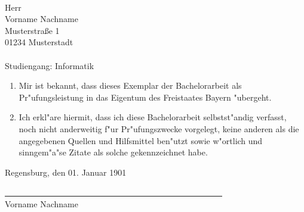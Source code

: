 %
%
\text{ }
\vspace{7cm}
\\
Herr\\
Vorname Nachname\\
Musterstraße 1\\
01234 Musterstadt\\\\
Studiengang: Informatik\\

\begin{enumerate}
\item Mir ist bekannt, dass dieses Exemplar der Bachelorarbeit als Pr"ufungsleistung in das Eigentum des Freistaates Bayern "ubergeht.
\item Ich erkl"are hiermit, dass ich diese Bachelorarbeit selbstst"andig verfasst, noch nicht anderweitig f"ur Pr"ufungszwecke vorgelegt, keine anderen als die angegebenen Quellen und Hilfsmittel ben"utzt sowie w"ortlich und sinngem"a"se Zitate als solche gekennzeichnet habe.
\end{enumerate}
\vspace{1cm}
Regensburg, den 01. Januar 1901\\
\medskip
\medskip

\underline{~~~~~~~~~~~~~~~~~~~~~~~~~~~~~~~~~~~~~~~~~~~~~~~~~~~~}\\
Vorname Nachname\\

